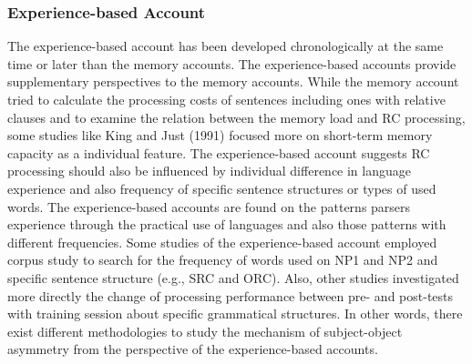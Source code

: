 \documentclass[
]{article}
\begin{document}
\subsubsection{Experience-based Account}\label{experience-based-account}

\setlength{\parindent}{1.27cm}

The experience-based account has been developed chronologically at the
same time or later than the memory accounts. The experience-based
accounts provide supplementary perspectives to the memory accounts.
While the memory account tried to calculate the processing costs of
sentences including ones with relative clauses and to examine the
relation between the memory load and RC processing, some studies like
King and Just (1991) focused more on short-term memory capacity as a
individual feature. The experience-based account suggests RC processing
should also be influenced by individual difference in language
experience and also frequency of specific sentence structures or types
of used words. The experience-based accounts are found on the patterns
parsers experience through the practical use of languages and also those
patterns with different frequencies. Some studies of the
experience-based account employed corpus study to search for the
frequency of words used on NP1 and NP2 and specific sentence structure
(e.g., SRC and ORC). Also, other studies investigated more directly the
change of processing performance between pre- and post-tests with
training session about specific grammatical structures. In other words,
there exist different methodologies to study the mechanism of
subject-object asymmetry from the perspective of the experience-based
accounts.
\end{document}
